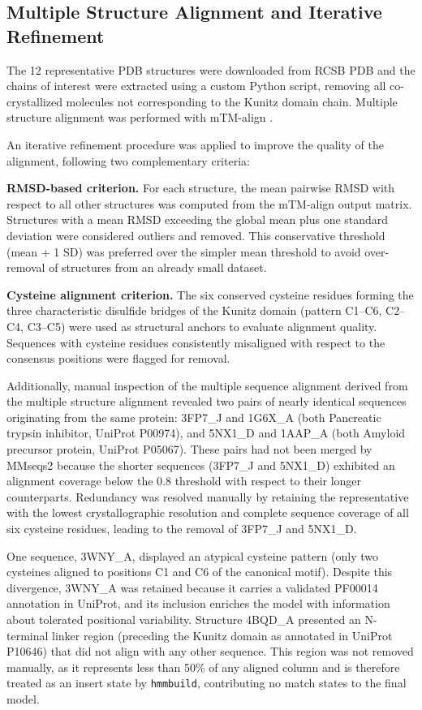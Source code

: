 \documentclass[11pt, a4paper]{article}
\begin{document}
\subsection{Multiple Structure Alignment and Iterative Refinement}

The 12 representative PDB structures were downloaded from RCSB PDB 
and the chains of interest were extracted using a custom Python 
script, removing all co-crystallized molecules not corresponding 
to the Kunitz domain chain. Multiple structure alignment was 
performed with mTM-align \cite{Dong2018}.

An iterative refinement procedure was applied to improve the 
quality of the alignment, following two complementary criteria:

\textbf{RMSD-based criterion.} For each structure, the mean 
pairwise RMSD with respect to all other structures was computed 
from the mTM-align output matrix. Structures with a mean RMSD 
exceeding the global mean plus one standard deviation were 
considered outliers and removed. This conservative threshold 
(mean + 1 SD) was preferred over the simpler mean threshold to 
avoid over-removal of structures from an already small dataset.

\textbf{Cysteine alignment criterion.} The six conserved cysteine 
residues forming the three characteristic disulfide bridges of 
the Kunitz domain (pattern C1--C6, C2--C4, C3--C5) were used as 
structural anchors to evaluate alignment quality. Sequences with 
cysteine residues consistently misaligned with respect to the 
consensus positions were flagged for removal.

Additionally, manual inspection of the multiple sequence alignment 
derived from the multiple structure alignment revealed two pairs 
of nearly identical sequences originating from the same protein: 
3FP7\_J and 1G6X\_A (both Pancreatic trypsin inhibitor, UniProt 
P00974), and 5NX1\_D and 1AAP\_A (both Amyloid precursor protein, 
UniProt P05067). These pairs had not been merged by MMseqs2 because 
the shorter sequences (3FP7\_J and 5NX1\_D) exhibited an alignment 
coverage below the 0.8 threshold with respect to their longer 
counterparts. Redundancy was resolved manually by retaining the 
representative with the lowest crystallographic resolution and 
complete sequence coverage of all six cysteine residues, leading 
to the removal of 3FP7\_J and 5NX1\_D.

One sequence, 3WNY\_A, displayed an atypical cysteine pattern 
(only two cysteines aligned to positions C1 and C6 of the 
canonical motif). Despite this divergence, 3WNY\_A was retained 
because it carries a validated PF00014 annotation in UniProt, 
and its inclusion enriches the model with information about 
tolerated positional variability. Structure 4BQD\_A presented 
an N-terminal linker region (preceding the Kunitz domain as 
annotated in UniProt P10646) that did not align with any other 
sequence. This region was not removed manually, as it represents 
less than 50\% of any aligned column and is therefore treated 
as an insert state by \texttt{hmmbuild}, contributing no match 
states to the final model.
\end{document}
